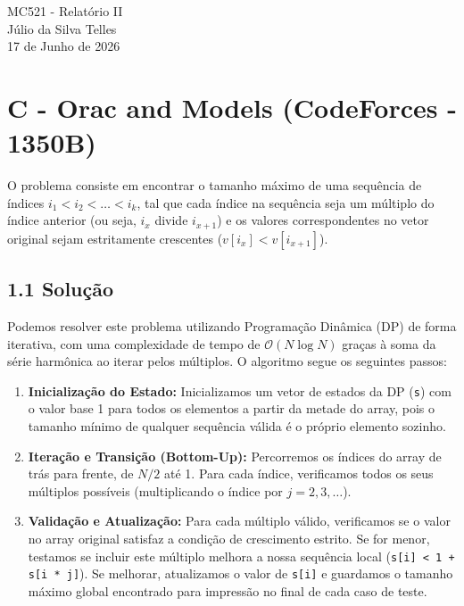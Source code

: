 \documentclass[12pt,a4paper]{article}
\begin{document}
\begin{center}
    {\LARGE MC521 - Relatório II} \\ [2,5em]
    {\large Júlio da Silva Telles} \\ [1,0em]
    {\large 17 de Junho de 2026} \\ [1,5em]
\end{center}

\vspace{1cm} 

\section{C - Orac and Models (CodeForces - 1350B)}
O problema consiste em encontrar o tamanho máximo de uma sequência de índices $i_1 < i_2 < \dots < i_k$, tal que cada índice na sequência seja um múltiplo do índice anterior (ou seja, $i_x$ divide $i_{x+1}$) e os valores correspondentes no vetor original sejam estritamente crescentes ($v[i_x] < v[i_{x+1}]$).

\subsection*{1.1 Solução}
Podemos resolver este problema utilizando Programação Dinâmica (DP) de forma iterativa, com uma complexidade de tempo de $\mathcal{O}(N \log N)$ graças à soma da série harmônica ao iterar pelos múltiplos. O algoritmo segue os seguintes passos:

\begin{enumerate}
    \item \textbf{Inicialização do Estado:} Inicializamos um vetor de estados da DP (\texttt{s}) com o valor base 1 para todos os elementos a partir da metade do array, pois o tamanho mínimo de qualquer sequência válida é o próprio elemento sozinho.
    \item \textbf{Iteração e Transição (Bottom-Up):} Percorremos os índices do array de trás para frente, de $N/2$ até 1. Para cada índice, verificamos todos os seus múltiplos possíveis (multiplicando o índice por $j = 2, 3, \dots$).
    \item \textbf{Validação e Atualização:} Para cada múltiplo válido, verificamos se o valor no array original satisfaz a condição de crescimento estrito. Se for menor, testamos se incluir este múltiplo melhora a nossa sequência local (\texttt{s[i] < 1 + s[i * j]}). Se melhorar, atualizamos o valor de \texttt{s[i]} e guardamos o tamanho máximo global encontrado para impressão no final de cada caso de teste.
\end{enumerate}
\end{document}
